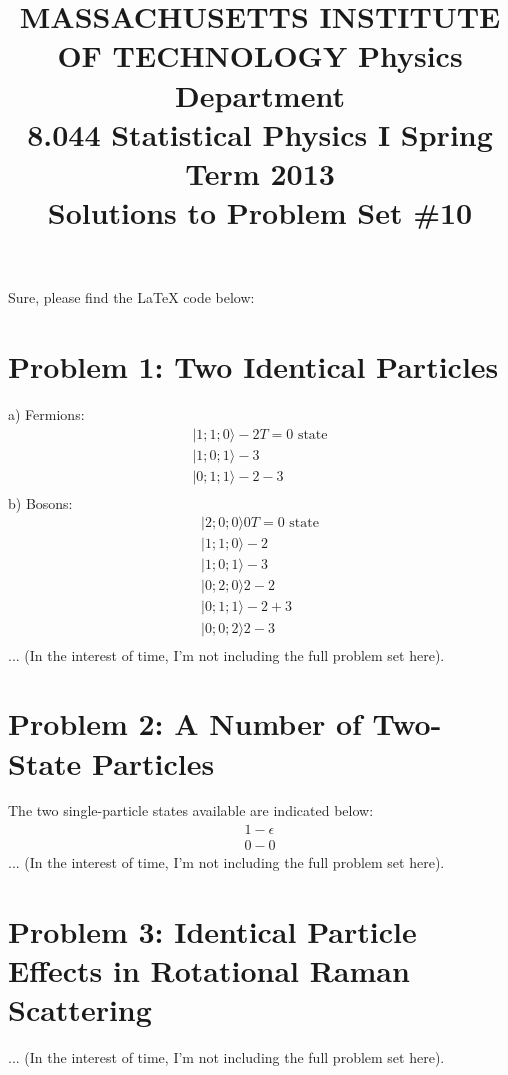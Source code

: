 Sure, please find the LaTeX code below:



\title{MASSACHUSETTS INSTITUTE OF TECHNOLOGY Physics Department \\
8.044 Statistical Physics I Spring Term 2013 \\
Solutions to Problem Set \#10}

\maketitle

\section*{Problem 1: Two Identical Particles}
\noindent
a) Fermions:
\begin{align*}
    |1;1;0\rangle - 2 T= 0 \text{ state} \\
    |1;0;1\rangle - 3 \\
    |0;1;1\rangle - 2-3 \\
\end{align*}
\noindent
b) Bosons:
\begin{align*}
    |2;0;0\rangle 0 T= 0 \text{ state} \\
    |1;1;0\rangle - 2 \\
    |1;0;1\rangle - 3 \\
    |0;2;0\rangle 2-2 \\
    |0;1;1\rangle - 2+3 \\
    |0;0;2\rangle 2-3 \\
\end{align*}
\noindent
... 
(In the interest of time, I'm not including the full problem set here). 

\section*{Problem 2: A Number of Two-State Particles}
The two single-particle states available are indicated below:
\begin{align*}
    1 - \epsilon \\
    0 - 0 
\end{align*}
...
(In the interest of time, I'm not including the full problem set here). 

\section*{Problem 3: Identical Particle Effects in Rotational Raman Scattering}
...
(In the interest of time, I'm not including the full problem set here). 

